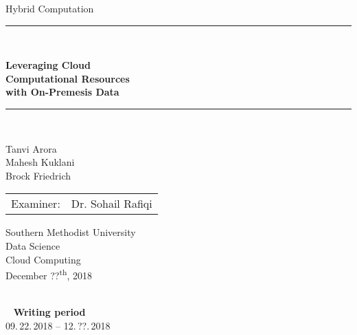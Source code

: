     
\begin{titlepage}
\begin{center}

\newcommand{\HorizontalLine}{\rule{\linewidth}{0.3mm}}

{\Large Hybrid Computation}\\[1.3cm]

  

\HorizontalLine \\[0.4cm]
\begin{spacing}{3}
    {\huge \bfseries Leveraging Cloud } \\
    {\huge \bfseries Computational Resources} \\
    {\huge \bfseries with On-Premesis Data
    }\\
\end{spacing}
\HorizontalLine \\[1.5cm]

\begin{spacing}{3}
    {\Huge Tanvi Arora} \\
    {\Huge Mahesh Kuklani} \\
    {\Huge Brock Friedrich} \\[1.5cm]
\end{spacing}

\begin{tabular}[hc]{>{\huge}l >{\huge}l}
Examiner: & Dr. Sohail Rafiqi \\[0.3cm]
\end{tabular}
\vfill  %

\Large {
    Southern Methodist University\\
    Data Science\\
    Cloud Computing\\[0.5cm]
    December ??\textsuperscript{th}, 2018\\
}
\end{center}
\end{titlepage}

\ \vfill \ \\  %
\
\textbf{Writing period}            \smallskip{} \\
09.\,22.\,2018 -- 12.\,??.\,2018   \bigskip{} \\
\